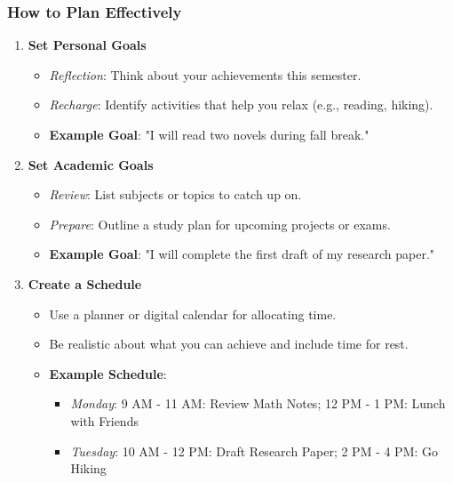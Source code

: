 \documentclass[aspectratio=169]{beamer}
\begin{document}
\begin{frame}[fragile]
    \frametitle{How to Plan Effectively}
    \begin{enumerate}
        \item \textbf{Set Personal Goals}
            \begin{itemize}
                \item \textit{Reflection}: Think about your achievements this semester.
                \item \textit{Recharge}: Identify activities that help you relax (e.g., reading, hiking).
                \item \textbf{Example Goal}: "I will read two novels during fall break."
            \end{itemize}
        
        \item \textbf{Set Academic Goals}
            \begin{itemize}
                \item \textit{Review}: List subjects or topics to catch up on.
                \item \textit{Prepare}: Outline a study plan for upcoming projects or exams.
                \item \textbf{Example Goal}: "I will complete the first draft of my research paper."
            \end{itemize}

        \item \textbf{Create a Schedule}
            \begin{itemize}
                \item Use a planner or digital calendar for allocating time.
                \item Be realistic about what you can achieve and include time for rest.
                \item \textbf{Example Schedule}: 
                \begin{itemize}
                    \item \textit{Monday}: 9 AM - 11 AM: Review Math Notes; 12 PM - 1 PM: Lunch with Friends
                    \item \textit{Tuesday}: 10 AM - 12 PM: Draft Research Paper; 2 PM - 4 PM: Go Hiking
                \end{itemize}
            \end{itemize}
    \end{enumerate}
\end{frame}
\end{document}
